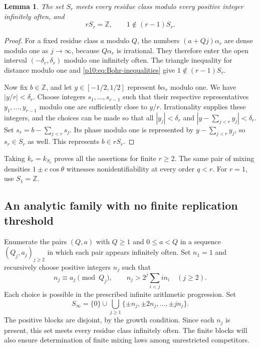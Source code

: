 \documentclass[11pt,letterpaper]{article}
\newtheorem{lemma}[theorem]{Lemma}
\theoremstyle{definition}
\theoremstyle{remark}
\newcommand{\1}{\mathbf 1}
\begin{document}
\begin{lemma}\label{p10:lem:Bohr-order}
The set $S_r$ meets every residue class modulo every positive integer
infinitely often, and
\[
 rS_r=\mathbb Z,\qquad 1\notin(r-1)S_r.
\]
\end{lemma}

\begin{proof}
For a fixed residue class $a$ modulo $Q$, the numbers
$(a+Qj)\alpha_r$ are dense modulo one as $j\to\infty$, because
$Q\alpha_r$ is irrational.  They therefore enter the open interval
$(-\delta_r,\delta_r)$ modulo one infinitely often.
The triangle inequality for distance modulo one and
\eqref{p10:eq:Bohr-inequalities} give
$1\notin(r-1)S_r$.

Now fix $b\in\mathbb Z$, and let $y\in[-1/2,1/2]$ represent
$b\alpha_r$ modulo one.  We have $|y/r|<\delta_r$.
Choose integers $s_1,\ldots,s_{r-1}$ such that their respective
representatives $y_1,\ldots,y_{r-1}$ modulo one are sufficiently close
to $y/r$.  Irrationality supplies these integers, and the choices can
be made so that all $|y_j|<\delta_r$ and
$|y-\sum_{j<r}y_j|<\delta_r$.
Set $s_r=b-\sum_{j<r}s_j$.  Its phase modulo one is represented by
$y-\sum_{j<r}y_j$, so $s_r\in S_r$ as well.  This represents
$b\in rS_r$.
\end{proof}

Taking $k_r=k_{S_r}$ proves all the assertions for finite $r\ge2$.
The same pair of mixing densities $1\pm c\cos\theta$ witnesses
nonidentifiability at every order $q<r$.
For $r=1$, use $S_1=\mathbb Z$.

\subsection{An analytic family with no finite replication threshold}

Enumerate the pairs $(Q,a)$ with $Q\ge1$ and $0\le a<Q$ in a sequence
$(Q_j,a_j)_{j\ge2}$ in which each pair appears infinitely often.
Set $n_1=1$ and recursively choose positive integers $n_j$ such that
\begin{equation}\label{p10:eq:lacunary-AP-construction}
 n_j\equiv a_j\pmod{Q_j},\qquad
 n_j>2^j\sum_{i<j}i n_i\quad(j\ge2).
\end{equation}
Each choice is possible in the prescribed infinite arithmetic
progression.  Set
\[
 S_\infty=\{0\}\cup
 \bigcup_{j\ge1}\{\pm n_j,\pm2n_j,\ldots,\pm jn_j\}.
\]
The positive blocks are disjoint, by the growth condition.
Since each $n_j$ is present, this set meets every residue class
infinitely often.  The finite blocks will also ensure determination of
finite mixing laws among unrestricted competitors.
\end{document}
